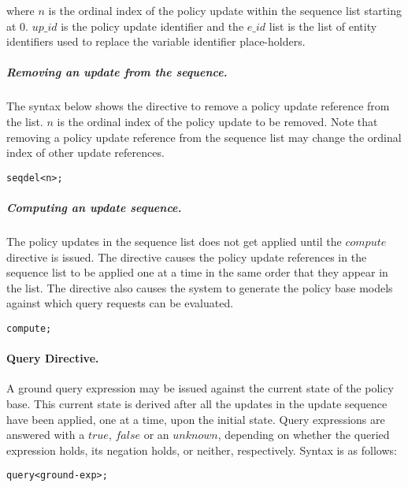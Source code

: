 \documentclass[11pt, twocolumn]{article}
\newenvironment{vverbatim}
  {\begin{alltt}}
  {\vspace{-\baselineskip}\end{alltt}}
\begin{document}
          \noindent where $n$ is the ordinal index of the policy update within
          the sequence list starting at 0. $up\_id$ is the policy update
          identifier and the $e\_id$ list is the list of entity identifiers
          used to replace the variable identifier place-holders.

        \subparagraph{Removing an update from the sequence.}
          The syntax below shows the directive to remove a policy update
          reference from the list. $n$ is the ordinal index of the policy
          update to be removed. Note that removing a policy update reference
          from the sequence list may change the ordinal index of other update
          references.

          \begin{vverbatim}
  seq del <n>;
          \end{vverbatim}

        \subparagraph{Computing an update sequence.}

          The policy updates in the sequence list does not get applied until
          the $compute$ directive is issued. The directive causes the policy
          update references in the sequence list to be applied one at a time in
          the same order that they appear in the list. The directive also
          causes the system to generate the policy base models against which
          query requests can be evaluated.

          \begin{vverbatim}
  compute;
          \end{vverbatim}

        \paragraph{Query Directive.}

          A ground query expression may be issued against the current state of
          the policy base. This current state is derived after all the updates
          in the update sequence have been applied, one at a time, upon the
          initial state. Query expressions are answered with a $true$, $false$
          or an $unknown$, depending on whether the queried expression holds,
          its negation holds, or neither, respectively. Syntax is as follows:

          \begin{vverbatim}
  query <ground-exp>;
          \end{vverbatim}
\end{document}
